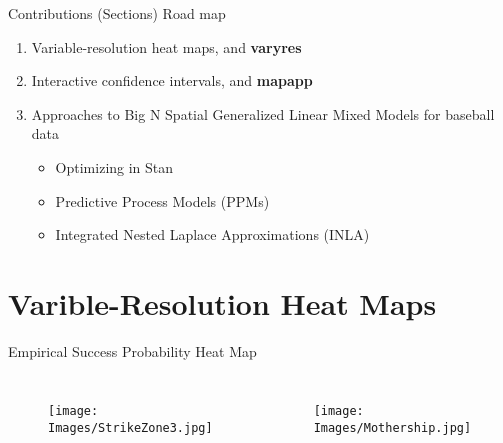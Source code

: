 \documentclass{beamer}
\begin{document}
\begin{frame}{Contributions (Sections) Road map}{}
\begin{enumerate}
\addtolength{\itemsep}{0.5\baselineskip}
\item Variable-resolution heat maps, and {\bf varyres}
\item Interactive confidence intervals, and {\bf mapapp}
\item Approaches to Big N Spatial Generalized Linear Mixed Models for baseball data \\
  \begin{itemize}
  \addtolength{\itemsep}{0.5\baselineskip}
  \item Optimizing in Stan \citep{STANtheMan}
  \item Predictive Process Models (PPMs) \citep{Banerjee2008}
  \item Integrated Nested Laplace Approximations (INLA) \citep{Rue2009}
  \end{itemize}
\end{enumerate}
\end{frame}

\section{Varible-Resolution Heat Maps}

\begin{frame}{Empirical Success Probability Heat Map} %
\begin{columns}


  \begin{figure}[H]
	\centering
	\texttt{[image: Images/StrikeZone3.jpg]}
	\end{figure}

  \begin{figure}[H]
	\centering
	\texttt{[image: Images/Mothership.jpg]}
	\end{figure}

\end{columns}
\end{frame}
\end{document}
